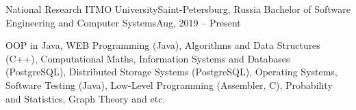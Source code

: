 

\begin{cvHeadingList}

  \cvCustomHeading
    {National Research ITMO University}{Saint-Petersburg, Russia}
    {Bachelor of Software Engineering and Computer Systems}{Aug, 2019 – Present}

  \begin{cvList}
    \cvItem[Courses]
      OOP in Java,
      WEB Programming (Java),
      Algorithms and Data Structures (C++),
      Computational Maths,
      Information Systems and Databases (PostgreSQL),
      Distributed Storage Systems (PostgreSQL),
      Operating Systems,
      Software Testing (Java),
      Low-Level Programming (Assembler, C),
      Probability and Statistics,
      Graph Theory and etc.
  \end{cvList}

\end{cvHeadingList}

